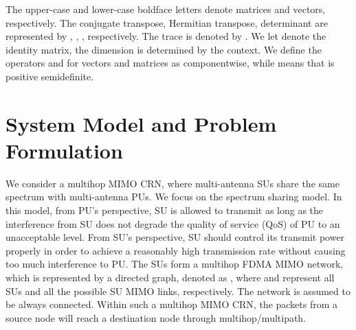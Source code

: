 \documentclass[12pt,onecolumn,tworows]{IEEEtran}
\begin{document}
The upper-case and lower-case boldface letters denote matrices and vectors, respectively. The conjugate transpose, Hermitian transpose, determinant are represented by , , , respectively. The trace is denoted by . We let  denote the identity matrix, the dimension is determined by the context. We define the operators  and  for vectors and matrices as componentwise, while \smash{\scriptscriptstyle-} means that  is positive semidefinite.

\section{System Model and Problem Formulation}
We consider a multihop MIMO CRN, where multi-antenna SUs share the same spectrum with multi-antenna PUs.
We focus on the spectrum sharing model. In this model, from PU's perspective, SU is allowed to transmit as long as the
interference from SU does not degrade the quality of service
(QoS) of PU to an unacceptable level. From SU's perspective,
SU should control its transmit power properly in order to
achieve a reasonably high transmission rate without causing
too much interference to PU.
The SUs form a multihop FDMA MIMO network, which is represented by a directed graph, denoted as , where  and  represent all SUs and all the possible SU MIMO links, respectively. The network is assumed to be always connected. Within such a multihop MIMO CRN, the packets from a source node will reach a destination
node through multihop/multipath.
\end{document}
